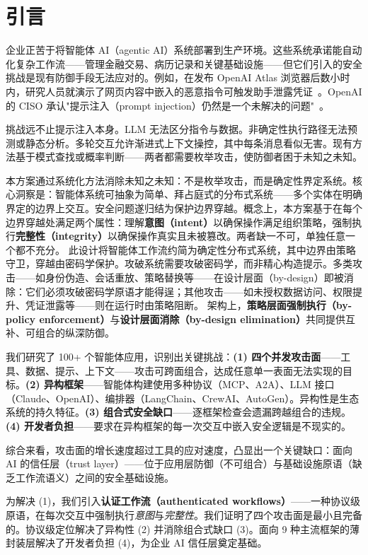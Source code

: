 \section{引言}
\label{sec:introduction}

企业正苦于将智能体 AI（agentic AI）系统部署到生产环境。这些系统承诺能自动化复杂工作流——管理金融交易、病历记录和关键基础设施——但它们引入的安全挑战是现有防御手段无法应对的。例如，在发布 OpenAI Atlas 浏览器后数小时内，研究人员就演示了网页内容中嵌入的恶意指令可触发助手泄露凭证~\cite{atlas-cve}。OpenAI 的 CISO 承认"提示注入（prompt injection）仍然是一个未解决的问题"~\cite{openai-ciso-atlas}。

挑战远不止提示注入本身。LLM 无法区分指令与数据。非确定性执行路径无法预测或静态分析。多轮交互允许渐进式上下文操控，其中每条消息看似无害。现有方法基于模式查找或概率判断——两者都需要枚举攻击，使防御者困于未知之未知。

本方案通过系统化方法消除未知之未知：不是枚举攻击，而是确定性界定系统。核心洞察是：智能体系统可抽象为简单、拜占庭式的分布式系统——多个实体在明确界定的边界上交互。安全问题遂归结为保护边界穿越。概念上，本方案基于在每个边界穿越处满足两个属性：理解\textbf{意图（intent）}以确保操作满足组织策略，强制执行\textbf{完整性（integrity）}以确保操作真实且未被篡改。两者缺一不可，单独任意一个都不充分。
此设计将智能体工作流约简为确定性分布式系统，其中边界由策略守卫，穿越由密码学保护。攻破系统需要攻破密码学，而非精心构造提示。多类攻击——如身份伪造、会话重放、策略替换等——在设计层面（by-design）即被消除：它们必须攻破密码学原语才能得逞；其他攻击——如未授权数据访问、权限提升、凭证泄露等——则在运行时由策略阻断。
架构上，\textbf{策略层面强制执行（by-policy enforcement）}与\textbf{设计层面消除（by-design elimination）}共同提供互补、可组合的纵深防御。

我们研究了 100+ 个智能体应用，识别出关键挑战：\textbf{(1) 四个并发攻击面}——工具、数据、提示、上下文——攻击可跨面组合，达成任意单一表面无法实现的目标。\textbf{(2) 异构框架}——智能体构建使用多种协议（MCP、A2A）、LLM 接口（Claude、OpenAI）、编排器（LangChain、CrewAI、AutoGen）。异构性是生态系统的持久特征。\textbf{(3) 组合式安全缺口}——逐框架检查会遗漏跨越组合的违规。\textbf{(4) 开发者负担}——要求在异构框架的每一次交互中嵌入安全逻辑是不现实的。

综合来看，攻击面的增长速度超过工具的应对速度，凸显出一个关键缺口：面向 AI 的信任层（trust layer）——位于应用层防御（不可组合）与基础设施原语（缺乏工作流语义）之间的安全基础设施。

为解决 (1)，我们引入\textbf{认证工作流（authenticated workflows）}——一种协议级原语，在每次交互中强制执行\textit{意图}与\textit{完整性}。我们证明了四个攻击面是最小且完备的。协议级定位解决了异构性 (2) 并消除组合式缺口 (3)。面向 9 种主流框架的薄封装层解决了开发者负担 (4)，为企业 AI 信任层奠定基础。

